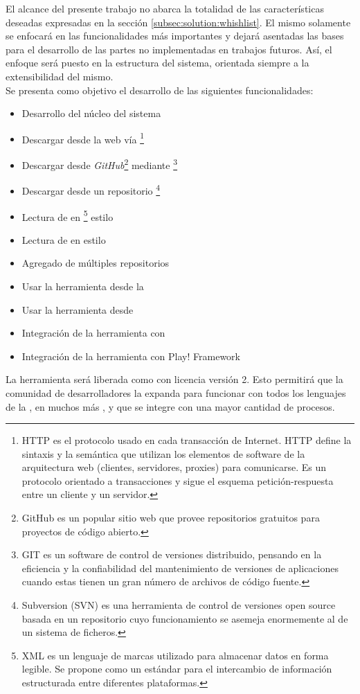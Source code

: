 El alcance del presente trabajo no abarca la totalidad de las características 
deseadas expresadas en la sección \ref{subsec:solution:whishlist}. El mismo 
solamente se enfocará en las funcionalidades más importantes y  dejará 
asentadas las bases para el desarrollo de las partes no implementadas en 
trabajos futuros. Así, el enfoque será puesto en la estructura del sistema, 
orientada siempre a la extensibilidad del mismo.\\
Se presenta como objetivo el desarrollo de las siguientes 
funcionalidades:
\begin{itemize}
	\setlength{\itemsep}{1pt}
	\setlength{\parskip}{0pt}
	\setlength{\parsep}{0pt}
	\item Desarrollo del núcleo del sistema
	\item Descargar \dependencies desde la web vía \http\footnote{
			HTTP es el protocolo usado en cada transacción de Internet. HTTP 
			define la sintaxis y la semántica que utilizan los elementos de 
			software de la arquitectura web (clientes, servidores, proxies) 
			para comunicarse. Es un protocolo orientado a transacciones y sigue 
			el esquema petición-respuesta entre un cliente y un servidor.
		}
	\item Descargar desde \emph{GitHub}\footnote{
			GitHub es un popular sitio web que provee repositorios \git 
			gratuitos para proyectos de código abierto.
		} mediante \git\footnote{
			GIT es un software de control de versiones distribuido, pensando en 
			la eficiencia y la confiabilidad del mantenimiento de versiones de 
			aplicaciones cuando	estas tienen un gran número de archivos de 
			código fuente.
		}
	\item Descargar desde un repositorio \svn\footnote{
			Subversion (SVN) es una herramienta de control de versiones open 
			source basada en un repositorio cuyo funcionamiento se asemeja 
			enormemente al de un sistema de ficheros.
		}
	\item Lectura de \conffiles en \xml\footnote{
			XML es un lenguaje de marcas utilizado para almacenar datos en forma
			legible. Se propone como un estándar para el intercambio de 
			información estructurada entre diferentes plataformas.
		} estilo \apache \maven
	\item Lectura de \conffiles en \xml estilo \apache \ivy
	\item Agregado de múltiples repositorios
	\item Usar la herramienta desde la \cli
	\item Usar la herramienta desde \scala
	\item Integración de la herramienta con \sbt
	\item Integración de la herramienta con Play! Framework
\end{itemize}

La herramienta será liberada como \freesoft con licencia \apache versión 2. 
Esto permitirá que la comunidad de desarrolladores la expanda para  
funcionar con todos los lenguajes de la \jvm, en muchos más \frameworks, y que  
se integre con una mayor cantidad de procesos.